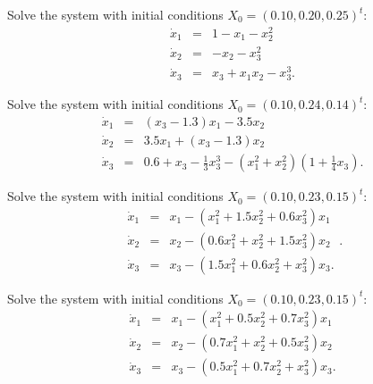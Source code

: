 \documentclass{ximera}
\begin{document}
\begin{exercise}  \label{c11.6.1a}
Solve the system  with initial conditions 
$X_0 = (0.10, 0.20, 0.25)^t$:
\begin{equation*} \label{e11.6.1a}
\begin{array}{rcl} 
\dot{x}_1 & = & 1 - x_1 - x_2^2 \\
\dot{x}_2 & = & -x_2-x_3^2   \\
\dot{x}_3 & = & x_3 +x_1x_2-x_3^3.   \end{array} 
\end{equation*}
\end{exercise}

\begin{exercise}  \label{c11.6.1d}
Solve the system  with initial conditions 
$X_0 = (0.10, 0.24, 0.14)^t$:
\begin{equation*} \label{e11.6.1d}
\begin{array}{rcl} 
\dot{x}_1 & = &   (x_3 - 1.3)x_1 - 3.5x_2 \\
\dot{x}_2 & = & 3.5x_1 + (x_3-1.3)x_2  \\
\dot{x}_3 & = &
0.6+x_3-\frac{1}{3}x_3^3-(x_1^2+x_2^2)(1+\frac{1}{4}x_3).\end{array}
\end{equation*}
\end{exercise}

\begin{exercise}  \label{c11.6.1c}
Solve the system  with initial conditions 
$X_0 = (0.10, 0.23, 0.15)^t$:
\begin{equation*} \label{e11.6.1c}
\begin{array}{rcl} 
\dot{x}_1 & = & x_1 - (x_1^2 + 1.5x_2^2 + 0.6x_3^2)x_1 \\
\dot{x}_2 & = & x_2 - (0.6x_1^2 + x_2^2 + 1.5x_3^2)x_2  \\
\dot{x}_3 & = & x_3 - (1.5x_1^2 + 0.6x_2^2 + x_3^2)x_3.   \end{array}. 
\end{equation*}
\end{exercise}

\begin{exercise}  \label{c11.6.1b}
Solve the system  with initial conditions 
$X_0 = (0.10, 0.23, 0.15)^t$:
\begin{equation*} \label{e11.6.1b}
\begin{array}{rcl} 
\dot{x}_1 & = & x_1 - (x_1^2 + 0.5x_2^2 + 0.7x_3^2)x_1 \\
\dot{x}_2 & = & x_2 - (0.7x_1^2 + x_2^2 + 0.5x_3^2)x_2  \\
\dot{x}_3 & = & x_3 - (0.5x_1^2 + 0.7x_2^2 + x_3^2)x_3.   \end{array}
\end{equation*}
\end{exercise}
\end{document}
